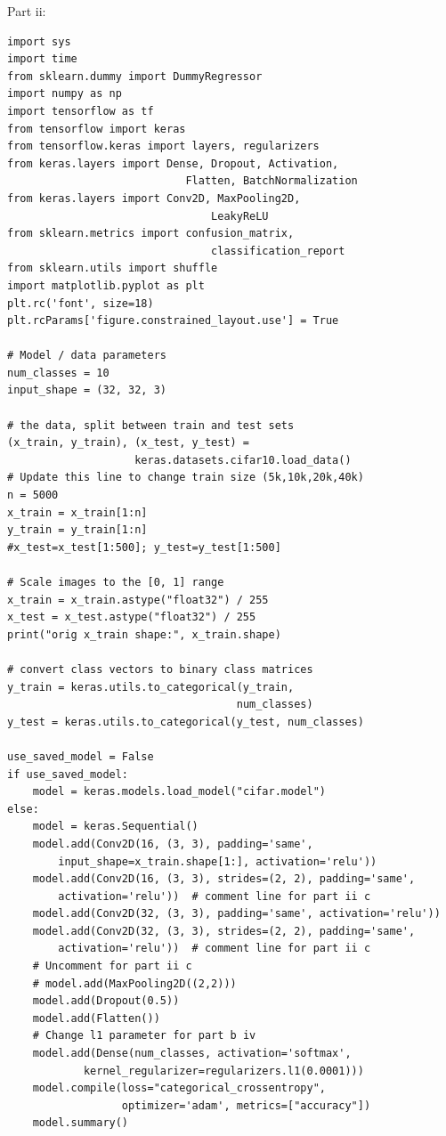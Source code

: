 \documentclass[10pt]{article}
\begin{document}
Part ii:
\begin{lstlisting}
import sys
import time
from sklearn.dummy import DummyRegressor
import numpy as np
import tensorflow as tf
from tensorflow import keras
from tensorflow.keras import layers, regularizers
from keras.layers import Dense, Dropout, Activation,
                            Flatten, BatchNormalization
from keras.layers import Conv2D, MaxPooling2D,
                                LeakyReLU
from sklearn.metrics import confusion_matrix,
                                classification_report
from sklearn.utils import shuffle
import matplotlib.pyplot as plt
plt.rc('font', size=18)
plt.rcParams['figure.constrained_layout.use'] = True

# Model / data parameters
num_classes = 10
input_shape = (32, 32, 3)

# the data, split between train and test sets
(x_train, y_train), (x_test, y_test) =
                    keras.datasets.cifar10.load_data()
# Update this line to change train size (5k,10k,20k,40k)
n = 5000
x_train = x_train[1:n]
y_train = y_train[1:n]
#x_test=x_test[1:500]; y_test=y_test[1:500]

# Scale images to the [0, 1] range
x_train = x_train.astype("float32") / 255
x_test = x_test.astype("float32") / 255
print("orig x_train shape:", x_train.shape)

# convert class vectors to binary class matrices
y_train = keras.utils.to_categorical(y_train,
                                    num_classes)
y_test = keras.utils.to_categorical(y_test, num_classes)

use_saved_model = False
if use_saved_model:
    model = keras.models.load_model("cifar.model")
else:
    model = keras.Sequential()
    model.add(Conv2D(16, (3, 3), padding='same',
        input_shape=x_train.shape[1:], activation='relu'))
    model.add(Conv2D(16, (3, 3), strides=(2, 2), padding='same',
        activation='relu'))  # comment line for part ii c
    model.add(Conv2D(32, (3, 3), padding='same', activation='relu'))
    model.add(Conv2D(32, (3, 3), strides=(2, 2), padding='same',
        activation='relu'))  # comment line for part ii c
    # Uncomment for part ii c
    # model.add(MaxPooling2D((2,2)))
    model.add(Dropout(0.5))
    model.add(Flatten())
    # Change l1 parameter for part b iv
    model.add(Dense(num_classes, activation='softmax',
            kernel_regularizer=regularizers.l1(0.0001)))
    model.compile(loss="categorical_crossentropy",
                  optimizer='adam', metrics=["accuracy"])
    model.summary()


\end{lstlisting}
\end{document}
